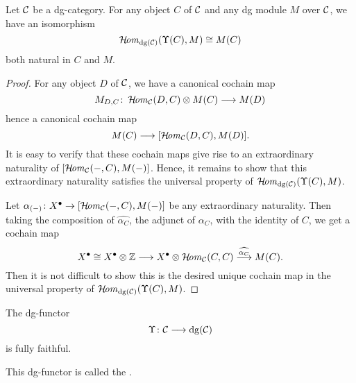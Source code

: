 


\begin{theorem}\label{thm:Yoneda}
Let ${\cal C}$ be a dg-category.
For any object $C$ of ${\cal C}$ and any dg module $M$ over ${\cal C}$, 
we have an isomorphism
\[
\operatorname{\mathcal{H}\!\mathit{om}}_{\mathrm{dg}({\cal C})}(\Upsilon(C),M) \cong M(C)
\]
both natural in $C$ and $M$.
\end{theorem}
\begin{proof}
For any object $D$ of ${\cal C}$, we have a canonical cochain map
\[
M_{D,C}\colon\operatorname{\mathcal{H}\!\mathit{om}}_{{\cal C}}(D,C)\otimes M(C)\longrightarrow M(D)
\]
hence a canonical cochain map
\[
M(C)\longrightarrow[\operatorname{\mathcal{H}\!\mathit{om}}_{{\cal C}}(D,C), M(D)].
\]
It is easy to verify that these cochain maps 
give rise to an extraordinary naturality of 
$[\operatorname{\mathcal{H}\!\mathit{om}}_{{\cal C}}(-,C), M(-)]$. 
Hence, it remains to show that 
this extraordinary naturality 
satisfies the universal property of 
$\operatorname{\mathcal{H}\!\mathit{om}}_{\mathrm{dg}({\cal C})}(\Upsilon(C),M)$.

Let $\alpha_{(-)}\colon X^{\bullet}\to[\operatorname{\mathcal{H}\!\mathit{om}}_{{\cal C}}(-,C), M(-)]$ 
be any extraordinary naturality. 
Then taking the composition of $\widehat{\alpha_C}$, 
the adjunct of $\alpha_C$, with the identity of $C$, 
we get a cochain map
\[
X^{\bullet}\cong 
X^{\bullet}\otimes{\mathbb Z}\longrightarrow
X^{\bullet}\otimes\operatorname{\mathcal{H}\!\mathit{om}}_{{\cal C}}(C,C)
\stackrel{{\widehat{\alpha_C}}}{\longrightarrow}
M(C).
\]
Then it is not difficult to show this is 
the desired unique cochain map in the 
universal property of $\operatorname{\mathcal{H}\!\mathit{om}}_{\mathrm{dg}({\cal C})}(\Upsilon(C),M)$. 
\end{proof}
\begin{corollary}
The dg-functor 
\[
\Upsilon\colon{\cal C}\longrightarrow\mathrm{dg}({\cal C})
\]
is fully faithful.
\end{corollary}
\begin{Rem}
This dg-functor is called the .
\end{Rem}

